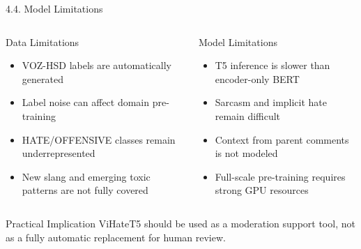 \documentclass[11pt, aspectratio=169]{beamer}
\begin{document}
\begin{frame}[shrink=5]{4.4. Model Limitations}

\begin{columns}[T]
  \begin{block}{Data Limitations}
    \begin{itemize}
      \item VOZ-HSD labels are automatically generated
      \item Label noise can affect domain pre-training
      \item HATE/OFFENSIVE classes remain underrepresented
      \item New slang and emerging toxic patterns are not fully covered
    \end{itemize}
  \end{block}

  \begin{block}{Model Limitations}
    \begin{itemize}
      \item T5 inference is slower than encoder-only BERT
      \item Sarcasm and implicit hate remain difficult
      \item Context from parent comments is not modeled
      \item Full-scale pre-training requires strong GPU resources
    \end{itemize}
  \end{block}
\end{columns}

\vspace{0.3cm}
\begin{block}{Practical Implication}
  ViHateT5 should be used as a moderation support tool, not as a fully automatic replacement for human review.
\end{block}
\end{frame}
\end{document}
